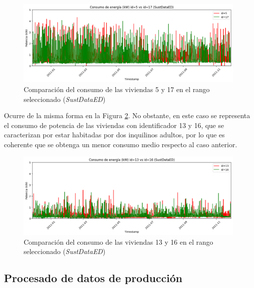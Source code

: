 \vspace{3mm}

\begin{figure}[h!]
  \centering
  \includegraphics[width=1\textwidth]{img/diseno/517.png}
  \caption{Comparación del consumo de las viviendas 5 y 17 en el rango seleccionado (\textit{SustDataED})}
  \label{fig:517}
\end{figure}

\vspace{3mm}

Ocurre de la misma forma en la Figura \ref{fig:1316}. No obstante, en este caso se representa el consumo de potencia de las viviendas con identificador 13 y 16, que se caracterizan por estar habitadas por dos inquilinos adultos, por lo que es coherente que se obtenga un menor consumo medio respecto al caso anterior.

\vspace{3mm}

\begin{figure}[H]
  \centering
  \includegraphics[width=1\textwidth]{img/diseno/1316.png}
  \caption{Comparación del consumo de las viviendas 13 y 16 en el rango seleccionado (\textit{SustDataED})}
  \label{fig:1316}
\end{figure}

\subsection{Procesado de datos de producción}
\label{sec:procprod}

